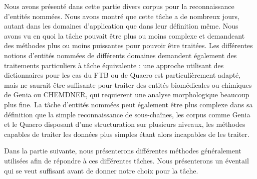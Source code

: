 \documentclass[PhD-Yoann-Dupont.tex]{subfiles}
\begin{document}
Nous avons présenté dans cette partie divers corpus pour la reconnaissance d'entités nommées. Nous avons montré que cette tâche a de nombreux jours, autant dans les domaines d'application que dans leur définition même. Nous avons vu en quoi la tâche pouvait être plus ou moins complexe et demandeant des méthodes plus ou moins puissantes pour pouvoir être traitées. Les différentes notions d'entités nommées de différents domaines demandent également des traitements particuliers à tâche équivalente : une approche utilisant des dictionnaires pour les cas du FTB ou de Quaero est particulièrement adapté, mais ne saurait être suffisante pour traiter des entités biomédicales ou chimiques de Genia ou CHEMDNER, qui requierent une analyse morphologique beaucoup plus fine. La tâche d'entités nommées peut également être plus complexe dans sa définition que la simple reconnaissance de sous-chaînes, les corpus comme Genia et le Quaero disposant d'une structuration sur plusieurs niveaux, les méthodes capables de traiter les données plus simples étant alors incapables de les traiter.

Dans la partie suivante, nous présenterons différentes méthodes généralement utilisées afin de répondre à ces différentes tâches. Nous présenterons un éventail qui se veut suffisant avant de donner notre choix pour la tâche.
\end{document}
